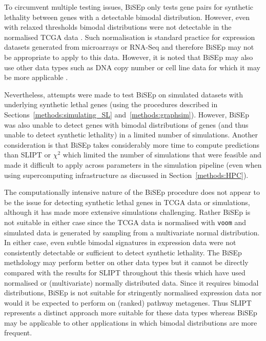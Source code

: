 To circumvent multiple testing issues, \gls{BiSEp} only tests gene pairs for synthetic lethality between genes with a detectable bimodal distribution. However, even with relaxed thresholds bimodal distributions were not detectable in the normalised TCGA data \citep{TCGA2012}. Such normalisation \cite{limma} is standard practice for expression datasets generated from microarrays or \gls{RNA-Seq} and therefore \gls{BiSEp} may not be appropriate to apply to this data. However, it is noted that \gls{BiSEp} may also use other data types such as DNA copy number or cell line data for which it may be more applicable \cite{Wappett2016}.

Nevertheless, attempts were made to test \gls{BiSEp} on simulated datasets with underlying synthetic lethal genes (using the procedures described in Sections~\ref{methods:simulating_SL} and~\ref{methods:graphsim}). However, \gls{BiSEp} was also unable to detect genes with bimodal distributions of genes (and thus unable to detect synthetic lethality) in a limited number of simulations. Another consideration is that \gls{BiSEp} takes considerably more time to compute predictions than \gls{SLIPT} or $\chi^2$ which limited the number of simulations that were feasible and made it difficult to apply across parameters in the simulation pipeline (even when using supercomputing infrastructure as discussed in Section~\ref{methods:HPC}).

The computationally intensive nature of the \gls{BiSEp} procedure does not appear to be the issue for detecting synthetic lethal genes in TCGA data or simulations, although it has made more extensive simulations challenging. Rather \gls{BiSEp} is not suitable in either case since the TCGA data is normalised with \texttt{voom} \citep{limma} and simulated data is generated by sampling from a multivariate normal distribution. In either case, even subtle bimodal signatures in expression data were not consistently detectable or sufficient to detect synthetic lethality. The \gls{BiSEp} methdology may perform better on other data types but it cannot be directly compared with the results for \gls{SLIPT} throughout this thesis which have used normalised or (multivariate) normally distributed data. Since it requires bimodal distributions, \gls{BiSEp} is not suitable for stringently normalised expression data nor would it be expected to perform on (ranked) pathway metagenes. Thus \gls{SLIPT} represents a distinct approach more suitable for these data types whereas \gls{BiSEp} may be applicable to other applications in which bimodal distributions are more frequent.

